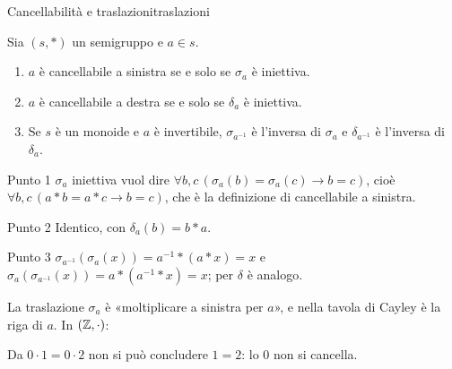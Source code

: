 \begin{concetto}
\begin{Proposizione}{Cancellabilità e traslazioni}{traslazioni}
    \begin{prerequisiti}
    \end{prerequisiti}
    Sia $(s, *)$ un semigruppo e $a \in s$.
    \begin{enumerate}
        \item $a$ è cancellabile a sinistra se e solo se $\sigma_a$ è iniettiva.
        \item $a$ è cancellabile a destra se e solo se $\delta_a$ è iniettiva.
        \item Se $s$ è un monoide e $a$ è invertibile, $\sigma_{a^{-1}}$ è l'inversa di $\sigma_a$ e $\delta_{a^{-1}}$ è l'inversa di $\delta_a$.
    \end{enumerate}
\end{Proposizione}
\begin{dimostrazione}
    \begin{caso}{Punto 1}
        $\sigma_a$ iniettiva vuol dire $\forall b, c\,(\sigma_a(b) = \sigma_a(c) \rightarrow b = c)$, cioè $\forall b, c\,(a * b = a * c \rightarrow b = c)$,
        che è la definizione di cancellabile a sinistra.
    \end{caso}
    \begin{caso}{Punto 2}
        Identico, con $\delta_a(b) = b * a$.
    \end{caso}
    \begin{caso}{Punto 3}
        $\sigma_{a^{-1}}(\sigma_a(x)) = a^{-1} * (a * x) = x$ e $\sigma_a(\sigma_{a^{-1}}(x)) = a * (a^{-1} * x) = x$; per $\delta$ è analogo.
    \end{caso}
\end{dimostrazione}
\end{concetto}

\begin{spiegazione}
    La traslazione $\sigma_a$ è «moltiplicare a sinistra per $a$», e nella tavola di Cayley è la riga di $a$. In $(\mathbb{Z}, \cdot)$:
    \begin{center}
    \end{center}
    Da $0 \cdot 1 = 0 \cdot 2$ non si può concludere $1 = 2$: lo $0$ non si cancella.
\end{spiegazione}


